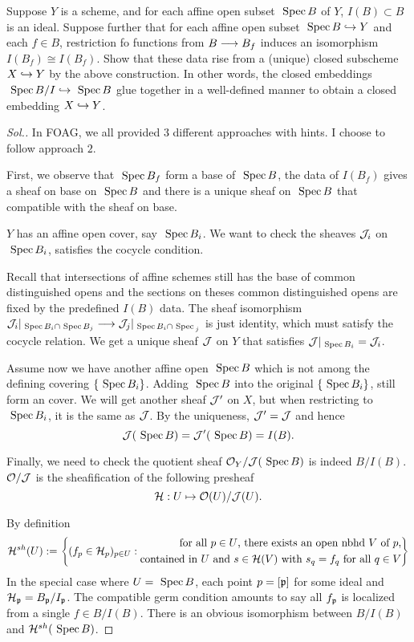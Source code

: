 \documentclass[11pt]{book} %
\begin{document}
\begin{exr}\label{chap8exr:criterion_closed_subscheme}
Suppose $Y$ is a scheme, and for each affine open subset $\text{ Spec\,} B$ of $Y$, $I(B)\subset B$ is an ideal. Suppose further that for each affine open subset $\text{ Spec\,} B\hookrightarrow Y$ and each $f\in B$, restriction fo functions from $B\longrightarrow B_f$ induces an isomorphism $I(B_f)\cong I(B_f)$. Show that these data rise from a (unique) closed subscheme $X\hookrightarrow Y$ by the above construction.  In other words, the closed embeddings $\text{ Spec\,} B/I\hookrightarrow \text{ Spec\,} B$ glue together in a well-defined manner to obtain a closed embedding $X\hookrightarrow Y$.
\end{exr}
\begin{proof}[Sol.]
In FOAG, we all provided 3 different approaches with hints. I choose to follow approach $2$.

First, we observe that $\text{ Spec\,} B_f$ form a base of $\text{ Spec\,} B$, the data of $I(B_f)$ gives a sheaf on base on $\text{ Spec\,} B$ and there is a unique sheaf on $\text{ Spec\,} B$ that compatible with the sheaf on base.

$Y$  has an affine open cover, say $\text{ Spec\,} B_i$. We want to check the sheaves ${\cal J}_i$ on $\text{ Spec\,} B_i$, satisfies the cocycle condition. 

Recall that intersections of affine schemes still has the base of common distinguished opens and the sections on theses common distinguished opens are fixed by the predefined $I(B)$ data. The sheaf isomorphism ${\cal J}_i|_{\text{ Spec\,} B_i\cap \text{ Spec\,} B_j}\longrightarrow {\cal J}_j|_{\text{ Spec\,} B_i\cap \text{ Spec\,}_j}$ is just identity, which must satisfy the cocycle relation. We get a unique sheaf ${\cal J}$ on $Y$ that satisfies ${\cal J}|_{\text{ Spec\,} B_i}={\cal J}_i$.

Assume now we have another affine open $\text{ Spec\,} B$ which is not among the defining covering $\{\text{ Spec\,} B_i\}$. Adding $\text{ Spec\,} B$ into the original $\{\text{ Spec\,} B_i\}$, still form an cover. We will get another sheaf ${\cal J}'$ on $X$, but when restricting to $\text{ Spec\,} B_i$, it is the same as ${\cal J}$. By the uniqueness, ${\cal J}'={\cal J}$ and hence 
$$
{\cal J}(\text{ Spec\,} B)={\cal J}'(\text{ Spec\,} B)=I(B).
$$

Finally, we need to check the quotient sheaf ${\cal O}_Y/{\cal J}(\text{ Spec\,} B)$ is indeed $B/I(B)$.
${\cal O}/{\cal J}$ is the sheafification of the following presheaf
$$
{\cal H}:U\mapsto {\cal O}(U)/{\cal J}(U).
$$

By definition 
$$
{\cal H}^{sh}(U):=\left\{(f_p\in{\cal H}_p)_{p\in U}:\begin{aligned}
\text{ for all $p \in U$, there exists an open nbhd $V$ of $p$},\\
  \text{contained in $U$ and $s\in {\cal H}(V)$ with $s_q=f_q$ for all $q\in  V$} 
  \end{aligned}
 \right\}
$$
In the special case where $U=\text{ Spec\,} B$, each point $p=[{\mathfrak p}]$ for some ideal and 
${\cal H}_{\mathfrak p}=B_{\mathfrak p}/I_{\mathfrak p}$. The compatible germ condition amounts to say all $f_{\mathfrak p}$ is localized from a single $f\in B/I(B)$. There is an obvious isomorphism between $B/I(B)$ and ${\cal H}^{sh}(\text{ Spec\,} B)$.
\end{proof}
\end{document}
